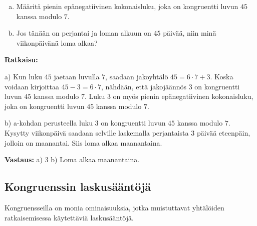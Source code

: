 \begin{esimerkki}
\begin{enumerate}[a)]
\item Määritä pienin epänegatiivinen kokonaisluku, joka on kongruentti luvun $45$ kanssa modulo $7$.
\item Jos tänään on perjantai ja loman alkuun on $45$ päivää, niin minä viikonpäivänä loma alkaa?
\end{enumerate}

{\bf Ratkaisu:}

a)
Kun luku $45$ jaetaan luvulla $7$, saadaan jakoyhtälö $45 = 6 \cdot 7 + 3$. Koska voidaan kirjoittaa $45 - 3 = 6 \cdot 7$, nähdään, että jakojäännös $3$ on kongruentti luvun $45$ kanssa modulo 7. Luku $3$ on myös pienin epänegatiivinen kokonaisluku, joka on kongruentti luvun $45$ kanssa modulo $7$.

b)
a-kohdan perusteella luku $3$ on kongruentti luvun $45$ kanssa modulo $7$. Kysytty viikonpäivä saadaan selville laskemalla perjantaista $3$ päivää eteenpäin, jolloin on maanantai. Siis loma alkaa maanantaina. 

{\bf Vastaus:} a) 3 b) Loma alkaa maanantaina.
\end{esimerkki}

\subsection*{Kongruenssin laskusääntöjä} Kongruensseilla on monia ominaisuuksia, jotka muistuttavat yhtälöiden ratkaisemisessa käytettäviä laskusääntöjä.



